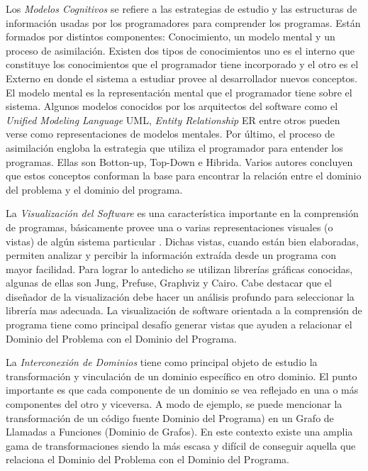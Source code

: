 \documentclass[12pt]{report}
\begin{document}
Los \textit{Modelos Cognitivos} se refiere a las estrategias de estudio y las estructuras de información usadas por los programadores para comprender los programas. Están formados por distintos componentes: Conocimiento, un modelo mental y un proceso de asimilación.
Existen dos tipos de conocimientos uno es el interno que constituye los conocimientos que el programador tiene incorporado y el otro es el Externo en donde el sistema a estudiar provee al desarrollador nuevos conceptos.
El modelo mental es la representación mental que el programador tiene sobre el sistema. Algunos modelos conocidos por los arquitectos del software como el \textit{Unified Modeling Language} UML, \textit{Entity Relationship} ER entre otros pueden verse como representaciones de modelos mentales.
Por último, el proceso de asimilación engloba la estrategia que utiliza el programador para entender los programas. Ellas son Botton-up, Top-Down e Hibrida.
Varios autores concluyen que estos conceptos conforman la base para encontrar la relación entre el dominio del problema y el dominio del programa\cite{TIE89,MPOB03}.


La \textit{Visualización del Software} es una característica importante en la comprensión de programas, básicamente provee una o varias representaciones visuales (o vistas) de algún sistema particular \cite{BRM10}.
Dichas vistas, cuando están bien elaboradas, permiten analizar y percibir la información extraída desde un programa con mayor facilidad.
Para lograr lo antedicho se utilizan librerías gráficas conocidas, algunas de ellas son Jung, Prefuse, Graphviz y Cairo.
Cabe destacar que el diseñador de la visualización debe hacer un análisis profundo para seleccionar la librería mas adecuada.
La visualización de software orientada a la comprensión de programa tiene como principal desafío generar vistas que ayuden a relacionar el Dominio del Problema con el Dominio del Programa.

La \textit{Interconexión de Dominios} \cite{BRM10} tiene como principal objeto de estudio la transformación y vinculación de un dominio específico en otro dominio. 
El punto importante es que cada componente de un dominio se vea reflejado en una o más componentes del otro y viceversa. 
A modo de ejemplo, se puede mencionar la transformación de un código fuente Dominio del Programa) en un Grafo de Llamadas a Funciones (Dominio de Grafos). En este contexto existe una amplia gama de transformaciones siendo la más escasa y difícil de conseguir aquella que relaciona el Dominio del Problema con el Dominio del Programa.
\end{document}

